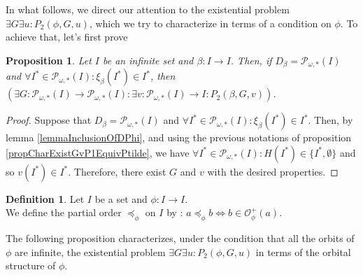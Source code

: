 \documentclass[a4paper,11pt]{article}
\theoremstyle{plain}
\newtheorem{proposition}{Proposition}[section]
\theoremstyle{definition}
\newtheorem{definition}{Definition}[section]
\theoremstyle{remark}
\begin{document}
In what follows, we direct our attention to the existential problem $\exists G \exists u : P_2(\phi,G,u)$, which we try to characterize in terms of a condition on $\phi$. To achieve that, let's first prove

\begin{proposition}
\label{propDbetaxibetainIImpliesExistGvP2}
Let $I$ be an infinite set and $\beta : I \to I$. Then, if $D_\beta = \mathcal{P}_{\omega,*}(I)$ and $\forall I^* \in \mathcal{P}_{\omega,*}(I) : \xi_\beta(I^*) \in I^*$, then $\left( \exists G : \mathcal{P}_{\omega,*}(I) \to \mathcal{P}_{\omega,*}(I) : \exists v : \mathcal{P}_{\omega,*}(I) \to I : P_2(\beta,G,v) \right)$.
\end{proposition}

\begin{proof}
Suppose that $D_\beta = \mathcal{P}_{\omega,*}(I)$ and $\forall I^* \in \mathcal{P}_{\omega,*}(I) : \xi_\beta(I^*) \in I^*$. Then, by lemma \ref{lemmaInclusionOfDPhi}, and using the previous notations of proposition \ref{propCharExistGvP1EquivPtilde}, we have $\forall I^* \in \mathcal{P}_{\omega,*}(I) : H(I^*) \in \{I^*,\emptyset\}$ and so $v(I^*) \in I^*$. Therefore, there exist $G$ and $v$ with the desired properties.
\end{proof}

\begin{definition}
Let $I$ be a set and $\phi : I \to I$. \\
We define the partial order $\preceq_\phi$ on $I$ by : $a \preceq_\phi b \Leftrightarrow b \in \mathcal{O}^{+}_\phi(a)$.
\end{definition}

The following proposition characterizes, under the condition that all the orbits of $\phi$ are infinite, the existential problem $\exists G \exists u : P_2(\phi,G,u)$ in terms of the orbital structure of $\phi$.
\end{document}
